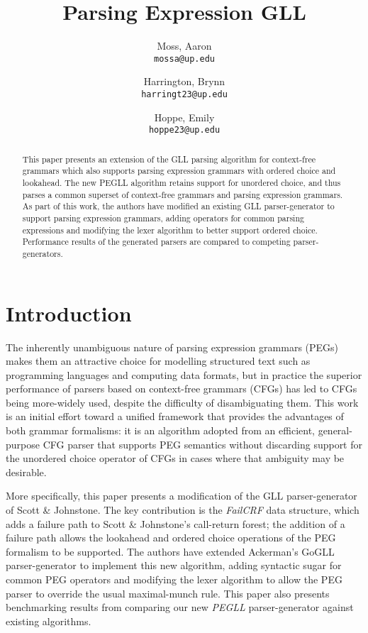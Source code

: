 \documentclass{article}
\title{Parsing Expression GLL}
\author{
    Moss, Aaron\\
    \texttt{mossa@up.edu}
    \and
    Harrington, Brynn\\
    \texttt{harringt23@up.edu}
    \and
    Hoppe, Emily\\
    \texttt{hoppe23@up.edu}
}
\begin{document}
\maketitle

\begin{abstract}
This paper presents an extension of the GLL parsing algorithm for context-free grammars which also supports parsing expression grammars with ordered choice and lookahead. 
The new PEGLL algorithm retains support for unordered choice, and thus parses a common superset of context-free grammars and parsing expression grammars. 
As part of this work, the authors have modified an existing GLL parser-generator to support parsing expression grammars, adding operators for common parsing expressions and modifying the lexer algorithm to better support ordered choice. 
Performance results of the generated parsers are compared to competing parser-generators.
\end{abstract}

\section{Introduction}
The inherently unambiguous nature of parsing expression grammars (PEGs) makes them an attractive choice for modelling structured text such as programming languages and computing data formats, but in practice the superior performance of parsers based on context-free grammars (CFGs) has led to CFGs being more-widely used, despite the difficulty of disambiguating them. 
This work is an initial effort toward a unified framework that provides the advantages of both grammar formalisms: it is an algorithm adopted from an efficient, general-purpose CFG parser that supports PEG semantics without discarding support for the unordered choice operator of CFGs in cases where that ambiguity may be desirable. 

More specifically, this paper presents a modification of the GLL parser-generator of Scott \& Johnstone\cite{SJ10,SJ16}. 
The key contribution is the \emph{FailCRF} data structure, which adds a failure path to Scott \& Johnstone's call-return forest; the addition of a failure path allows the lookahead and ordered choice operations of the PEG formalism to be supported.
The authors have extended Ackerman's GoGLL\cite{Ack19} parser-generator to implement this new algorithm, adding syntactic sugar for common PEG operators and modifying the lexer algorithm to allow the PEG parser to override the usual maximal-munch rule. 
This paper also presents benchmarking results from comparing our new \emph{PEGLL} parser-generator against existing algorithms.
\end{document}
